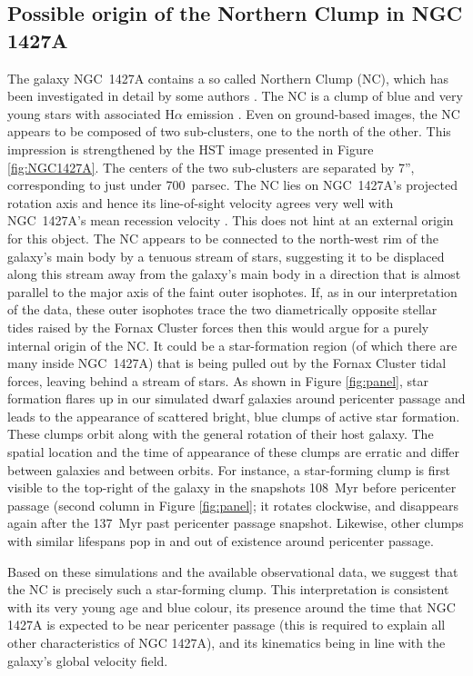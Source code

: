 \subsection{Possible origin of the Northern Clump in NGC 1427A} \label{NC1427A}
The galaxy NGC~1427A contains a so called Northern Clump (NC), which has been investigated in detail by some authors \citep{Cellone1997, Hilker1997}.
The NC is a clump of blue and very young stars with associated H$\alpha$ emission \citep{Sivanandam2014}. Even on ground-based images, the NC appears to be composed of two sub-clusters, one to the north of the other. This impression is strengthened by the HST image presented in Figure \ref{fig:NGC1427A}. The centers of the two sub-clusters are separated by 7'', corresponding to just under 700~parsec. The NC lies on NGC~1427A's projected rotation axis and hence its line-of-sight velocity agrees very well with NGC~1427A's mean recession velocity \citep{Bureau1996,Chaname2000}. This does not hint at an external origin for this object. The NC appears to be connected to the north-west rim of the galaxy's main body by a tenuous stream of stars, suggesting it to be displaced along this stream away from the galaxy's main body in a direction that is almost parallel to the major axis of the faint outer isophotes. If, as in our interpretation of the data, these outer isophotes trace the two diametrically opposite stellar tides raised by the Fornax Cluster forces then this would argue for a purely internal origin of the NC. It could be a star-formation region (of which there are many inside NGC~1427A) that is being pulled out by the Fornax Cluster tidal forces, leaving behind a stream of stars.
As shown in Figure \ref{fig:panel}, star formation flares up in our simulated dwarf galaxies around pericenter passage and leads to the appearance of scattered bright, blue clumps of active star formation. These clumps orbit along with the general rotation of their host galaxy. The spatial location and the time of appearance of these clumps are erratic and differ between galaxies and between orbits.
For instance, a star-forming clump is first visible to the top-right of the galaxy in the snapshots 108~Myr before pericenter passage (second column in Figure \ref{fig:panel}; it rotates clockwise, and disappears again after the 137~Myr past pericenter passage snapshot. Likewise, other clumps with similar lifespans pop in and out of existence around pericenter passage. 

Based on these simulations and the available observational data, we suggest that the NC is precisely such a star-forming clump. This interpretation is consistent with its very young age and blue colour, its presence around the time that NGC 1427A is expected to be near pericenter passage (this is required to explain all other characteristics of NGC 1427A), and its kinematics being in line with the galaxy's global velocity field.

